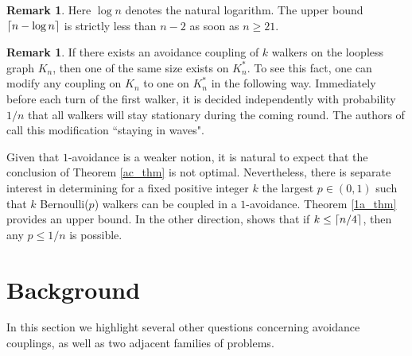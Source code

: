 \documentclass[11pt,reqno]{amsart} %
\numberwithin{equation}{section}
\theoremstyle{definition}
\newtheorem{remark}[thm]{Remark}
\DeclarePairedDelimiter\ceil{\lceil}{\rceil}
\begin{document}
\begin{remark}
Here $\log n$ denotes the natural logarithm.
The upper bound $\ceil{n-\log n}$ is strictly less than $n-2$ as soon as $n \geq 21$.
\end{remark}

\begin{remark}
If there exists an avoidance coupling of $k$ walkers on the loopless graph $K_n$, then one of the same size exists on $K_n^*$. 
To see this fact, one can modify any coupling on $K_n$ to one on $K_n^*$ in the following way.
Immediately before each turn of the first walker, it is decided independently with probability $1/n$ that all walkers will stay stationary during the coming round.
The authors of \cite{angel-holroyd-martin-wilson-winkler13} call this modification ``staying in waves".
\end{remark}

Given that $1$-avoidance is a weaker notion, it is natural to expect that the conclusion of Theorem \ref{ac_thm} is not optimal.
Nevertheless, there is separate interest in determining for a fixed positive integer $k$ the largest $p \in (0,1)$ such that $k$ Bernoulli($p$) walkers can be coupled in a $1$-avoidance.
Theorem \ref{1a_thm} provides an upper bound.
In the other direction, \cite[Section 5]{angel-holroyd-martin-wilson-winkler13} shows that if $k \leq \ceil{n/4}$, then any $p \leq 1/n$ is possible.


\section{Background} \label{background}
In this section we highlight several other questions concerning avoidance couplings, as well as two adjacent families of problems.
\end{document}
